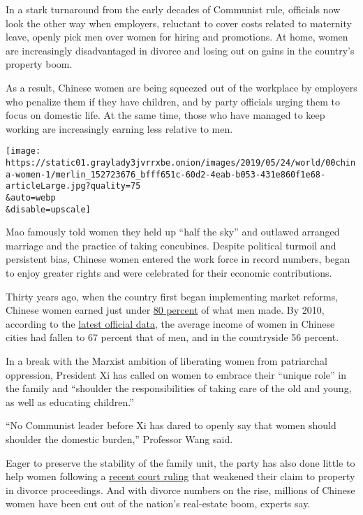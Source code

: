 In a stark turnaround from the early decades of Communist rule,
officials now look the other way when employers, reluctant to cover
costs related to maternity leave, openly pick men over women for hiring
and promotions. At home, women are increasingly disadvantaged in divorce
and losing out on gains in the country's property boom.

As a result, Chinese women are being squeezed out of the workplace by
employers who penalize them if they have children, and by party
officials urging them to focus on domestic life. At the same time, those
who have managed to keep working are increasingly earning less relative
to men.

\texttt{[image: https://static01.graylady3jvrrxbe.onion/images/2019/05/24/world/00china-women-1/merlin\_152723676\_bfff651c-60d2-4eab-b053-431e860f1e68-articleLarge.jpg?quality=75\\\&auto=webp\\\&disable=upscale]}

Mao famously told women they held up ``half the sky'' and outlawed
arranged marriage and the practice of taking concubines. Despite
political turmoil and persistent bias, Chinese women entered the work
force in record numbers, began to enjoy greater rights and were
celebrated for their economic contributions.

Thirty years ago, when the country first began implementing market
reforms, Chinese women earned just under
\href{http://www.stats.gov.cn/tjsj/tjgb/qttjgb/qgqttjgb/200203/t20020331_30606.html}{80
percent} of what men made. By 2010, according to the
\href{http://www.china.com.cn/zhibo/zhuanti/ch-xinwen/2011-10/21/content_23687810.htm}{latest
official data}, the average income of women in Chinese cities had fallen
to 67 percent that of men, and in the countryside 56 percent.

In a break with the Marxist ambition of liberating women from
patriarchal oppression, President Xi has called on women to embrace
their ``unique role'' in the family and ``shoulder the responsibilities
of taking care of the old and young, as well as educating children.''

``No Communist leader before Xi has dared to openly say that women
should shoulder the domestic burden,'' Professor Wang said.

Eager to preserve the stability of the family unit, the party has also
done little to help women following a
\href{https://www.nytimes3xbfgragh.onion/2011/09/08/world/asia/08iht-letter08.html}{recent
court ruling} that weakened their claim to property in divorce
proceedings. And with divorce numbers on the rise, millions of Chinese
women have been cut out of the nation's real-estate boom, experts say.

